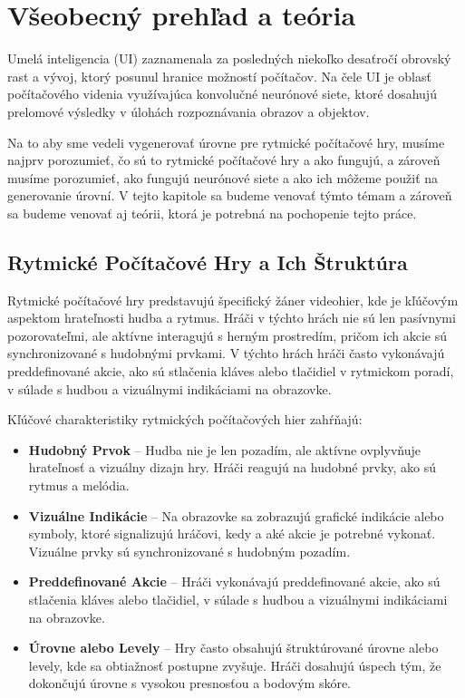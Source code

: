 \chapter{Všeobecný prehľad a teória}\label{chap:teoria}

Umelá inteligencia (UI) zaznamenala za posledných niekoľko desaťročí obrovský rast a vývoj, ktorý posunul hranice možností počítačov. Na čele UI je oblasť počítačového videnia využívajúca konvolučné neurónové siete, ktoré dosahujú prelomové výsledky v úlohách rozpoznávania obrazov a objektov. 

Na to aby sme vedeli vygenerovať úrovne pre rytmické počítačové hry, musíme najprv porozumieť, čo sú to rytmické počítačové hry a ako fungujú, a zároveň musíme porozumieť, ako fungujú neurónové siete a ako ich môžeme použiť na generovanie úrovní. V tejto kapitole sa budeme venovať týmto témam a zároveň sa budeme venovať aj teórii, ktorá je potrebná na pochopenie tejto práce.

\section{Rytmické Počítačové Hry a Ich Štruktúra}\label{sec:rytmicke_hry}


Rytmické počítačové hry predstavujú špecifický žáner videohier, kde je kľúčovým aspektom hrateľnosti hudba a rytmus. Hráči v týchto hrách nie sú len pasívnymi pozorovateľmi, ale aktívne interagujú s herným prostredím, pričom ich akcie sú synchronizované s hudobnými prvkami. V týchto hrách hráči často vykonávajú preddefinované akcie, ako sú stlačenia kláves alebo tlačidiel v rytmickom poradí, v súlade s hudbou a vizuálnymi indikáciami na obrazovke.

Kľúčové charakteristiky rytmických počítačových hier zahŕňajú:

\begin{itemize}
\item \textbf{Hudobný Prvok} – Hudba nie je len pozadím, ale aktívne ovplyvňuje hrateľnosť a vizuálny dizajn hry. Hráči reagujú na hudobné prvky, ako sú rytmus a melódia.
\item \textbf{Vizuálne Indikácie} – Na obrazovke sa zobrazujú grafické indikácie alebo symboly, ktoré signalizujú hráčovi, kedy a aké akcie je potrebné vykonať. Vizuálne prvky sú synchronizované s hudobným pozadím.
\item \textbf{Preddefinované Akcie} – Hráči vykonávajú preddefinované akcie, ako sú stlačenia kláves alebo tlačidiel, v súlade s hudbou a vizuálnymi indikáciami na obrazovke.
\item \textbf{Úrovne alebo Levely} – Hry často obsahujú štruktúrované úrovne alebo levely, kde sa obtiažnosť postupne zvyšuje. Hráči dosahujú úspech tým, že dokončujú úrovne s vysokou presnosťou a bodovým skóre.
\end{itemize}

